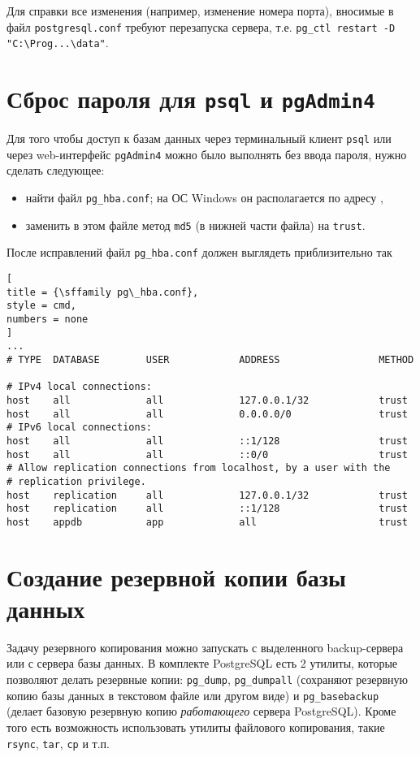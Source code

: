 \documentclass[%
	11pt,
	a4paper,
	utf8,
		]{article}
\begin{document}
Для справки все изменения (например, изменение номера порта), вносимые в файл \texttt{postgresql.conf} требуют перезапуска сервера, т.е. \verb|pg_ctl restart -D "C:\Prog...\data"|.


\section{Сброс пароля для \texttt{psql} и \texttt{pgAdmin4}}

Для того чтобы доступ к базам данных через терминальный клиент \texttt{psql} или через web-интерфейс \texttt{pgAdmin4} можно было выполнять без ввода пароля, нужно сделать следующее:
\begin{itemize}
	\item найти файл \texttt{pg\_hba.conf}; на ОС Windows он располагается по адресу ,
	
	\item заменить в этом файле метод \texttt{md5} (в нижней части файла) на \texttt{trust}.
\end{itemize}

После исправлений файл \texttt{pg\_hba.conf} должен выглядеть приблизительно так
\begin{lstlisting}[
title = {\sffamily pg\_hba.conf},
style = cmd,
numbers = none
]
...
# TYPE  DATABASE        USER            ADDRESS                 METHOD

# IPv4 local connections:
host    all             all             127.0.0.1/32            trust
host    all             all             0.0.0.0/0               trust
# IPv6 local connections:
host    all             all             ::1/128                 trust
host    all             all             ::0/0                   trust
# Allow replication connections from localhost, by a user with the
# replication privilege.
host    replication     all             127.0.0.1/32            trust
host    replication     all             ::1/128                 trust
host    appdb           app             all                     trust

\end{lstlisting}

\section{Создание резервной копии базы данных}

Задачу резервного копирования можно запускать с выделенного backup-сервера или с сервера базы данных. В комплекте PostgreSQL есть 2 утилиты, которые позволяют делать резервные копии: \texttt{pg\_dump}, \texttt{pg\_dumpall} (сохраняют резервную копию базы данных в текстовом файле или другом виде) и \texttt{pg\_basebackup} (делает базовую резервную копию \emph{работающего} сервера PostgreSQL). Кроме того есть возможность использовать утилиты файлового копирования, такие \texttt{rsync}, \texttt{tar}, \texttt{cp} и т.п.
\end{document}

